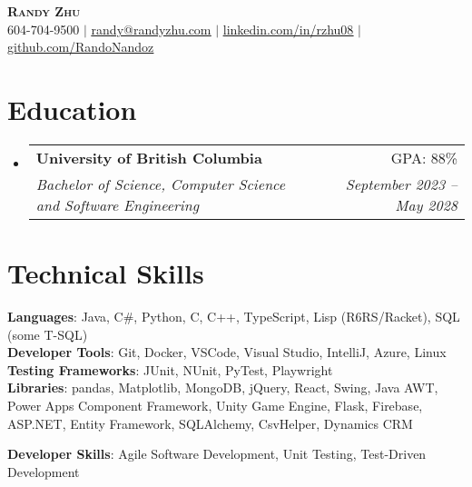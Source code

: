 \documentclass[letterpaper,11pt]{article}
\makeatletter
\newcommand{\resumeSubheading}[4]{
  \vspace{-2pt}\item
    \begin{tabular*}{0.97\textwidth}[t]{l@{\extracolsep{\fill}}r}
      \textbf{#1} & #2 \\
      \textit{\small#3} & \textit{\small #4} \\
    \end{tabular*}\vspace{-7pt}
}
\newcommand{\resumeSubHeadingListStart}{\begin{itemize}[leftmargin=0.15in, label={}]}
\newcommand{\resumeSubHeadingListEnd}{\end{itemize}}
\makeatother
\begin{document}

\begin{center}
  \textbf{\Huge \scshape Randy Zhu} \\ \vspace{1pt}
  \small 604-704-9500 $|$ \href{mailto:randy@randyzhu.com}{\underline{randy@randyzhu.com}} $|$
  \href{https://www.linkedin.com/in/rzhu08/}{\underline{linkedin.com/in/rzhu08}} $|$
  \href{https://github.com/RandoNandoz}{\underline{github.com/RandoNandoz}}
\end{center}

\section{Education}
\resumeSubHeadingListStart
\resumeSubheading
{University of British Columbia}{GPA: 88\%}
{Bachelor of Science, Computer Science and Software Engineering}{September 2023 -- May 2028}
\resumeSubHeadingListEnd

%
\section{Technical Skills}
\begin{itemize}[leftmargin=0.15in, label={}]
  \small{\item{
        \textbf{Languages}{: Java, C\#, Python, C, C++, TypeScript, Lisp (R6RS/Racket), SQL (some T-SQL)} \\
        \textbf{Developer Tools}{: Git, Docker, VSCode, Visual Studio, IntelliJ, Azure, Linux} \\
        \textbf{Testing Frameworks}{: JUnit, NUnit, PyTest, Playwright} \\
        \textbf{Libraries}{:
          pandas, Matplotlib, MongoDB, jQuery, React, Swing, Java AWT,
          Power Apps Component Framework, Unity Game Engine, Flask, Firebase,
          ASP.NET, Entity Framework, SQLAlchemy, CsvHelper, Dynamics CRM
        } \\}}
        \textbf{Developer Skills}{: Agile Software Development, Unit Testing, Test-Driven Development }
\end{itemize}
\end{document}
